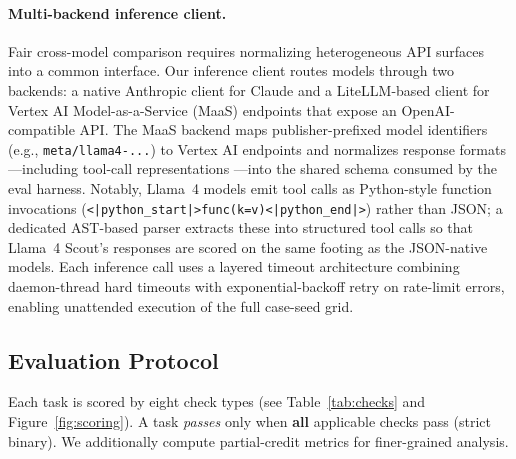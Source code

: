 \documentclass[sigconf]{acmart}
\begin{document}
\paragraph{Multi-backend inference client.}
Fair cross-model comparison requires normalizing heterogeneous API surfaces into a common interface. Our inference client routes models through two backends: a native Anthropic client for Claude and a LiteLLM-based client for Vertex AI Model-as-a-Service (MaaS) endpoints that expose an OpenAI-compatible API. The MaaS backend maps publisher-prefixed model identifiers (e.g., \texttt{meta/llama4-...}) to Vertex AI endpoints and normalizes response formats ---including tool-call representations ---into the shared schema consumed by the eval harness. Notably, Llama~4 models emit tool calls as Python-style function invocations (\texttt{<|python\_start|>func(k=v)<|python\_end|>}) rather than JSON; a dedicated AST-based parser extracts these into structured tool calls so that Llama~4 Scout's responses are scored on the same footing as the JSON-native models. Each inference call uses a layered timeout architecture combining daemon-thread hard timeouts with exponential-backoff retry on rate-limit errors, enabling unattended execution of the full case-seed grid.


\subsection{Evaluation Protocol}
\label{sec:scoring}

Each task is scored by eight check types (see Table~\ref{tab:checks} and Figure~\ref{fig:scoring}). A task \emph{passes} only when \textbf{all} applicable checks pass (strict binary). We additionally compute partial-credit metrics for finer-grained analysis.
\end{document}
